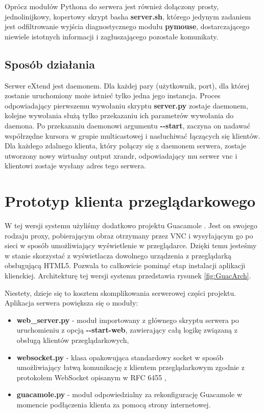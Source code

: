     Oprócz modułów Pythona do serwera jest również dołączony prosty, jednolinijkowy, kopertowy skrypt basha \textbf{server.sh}, którego jedynym zadaniem jest odfiltrowanie wyjścia diagnostycznego modułu \textbf{pymouse}, dostarczającego niewiele istotnych informacji i zagłuszającego pozostałe komunikaty.

  \subsection{Sposób działania}

    Serwer eXtend jest daemonem. Dla każdej pary (użytkownik, port), dla której zostanie uruchomiony może istnieć tylko jedna jego instancja. Proces odpowiadający pierwszemu wywołaniu skryptu \textbf{server.py} zostaje daemonem, kolejne wywołania służą tylko przekazaniu ich parametrów wywołania do daemona. Po przekazaniu daemonowi argumentu \textbf{-{}-start}, zaczyna on nadawać współrzędne kursora w grupie multicastowej i nasłuchiwać łączących się klientów. Dla każdego zdalnego klienta, który połączy się z daemonem serwera, zostaje utworzony nowy wirtualny output xrandr, odpowiadający mu serwer vnc i klientowi zostaje wysłany adres tego serwera.

\section{Prototyp klienta przeglądarkowego}


  W tej wersji systemu użyliśmy dodatkowo projektu Guacamole \cite{Guacamole}. Jest on swojego rodzaju proxy, pobierającym obraz otrzymany przez VNC i wysyłającym go po sieci w sposób umożliwiający wyświetlenie w przeglądarce. Dzięki temu jesteśmy w stanie skorzystać z wyświetlacza dowolnego urządzenia z przeglądarką obsługującą HTML5. Pozwala to całkowicie pominąć etap instalacji aplikacji klienckiej. Architekturę tej wersji systemu przedstawia rysunek \ref{fig:GuacArch}.

  Niestety, dzieje się to kosztem skomplikowania serwerowej części projektu. Aplikacja serwera powiększa się o moduły:

  \begin{itemize}
    \item \textbf{web\_server.py} - moduł importowany z głównego skryptu serwera po uruchomieniu z opcją \textbf{-{}-start-web}, zawierający całą logikę związaną z obsługą klientów przeglądarkowych,
    \item \textbf{websocket.py} - klasa opakowująca standardowy socket w sposób umożliwiający łatwą komunikację z klientem przeglądarkowym zgodnie z protokołem WebSocket opisanym w RFC 6455 \cite{RFC6455},
    \item \textbf{guacamole.py} - moduł odpowiedzialny za rekonfigurację Guacamole w momencie podłączenia klienta za pomocą strony internetowej.
  \end{itemize}

